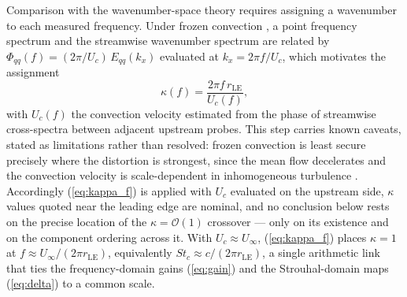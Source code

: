 \documentclass[lineno]{JFM-FLM_Au}
\begin{document}
Comparison with the wavenumber-space theory requires assigning a
wavenumber to each measured frequency. Under frozen convection
\citep{Taylor1938}, a point frequency spectrum and the streamwise
wavenumber spectrum are related by
$\Phi_{qq}(f) = (2\pi/U_c)\,E_{qq}(k_x)$ evaluated at
$k_x = 2\pi f/U_c$, which motivates the assignment
\begin{equation}
  \kappa(f) = \frac{2\pi f\,r_{\mathrm{LE}}}{U_c(f)},
  \label{eq:kappa_f}
\end{equation}
with $U_c(f)$ the convection velocity estimated from the phase of
streamwise cross-spectra between adjacent upstream probes. This step
carries known caveats, stated as limitations rather than resolved: frozen
convection is least secure precisely where the distortion is strongest,
since the mean flow decelerates and the convection velocity is
scale-dependent in inhomogeneous turbulence
\citep{WyngaardClifford1977,DelAlamoJimenez2009}. Accordingly
(\ref{eq:kappa_f}) is applied with $U_c$ evaluated on the upstream side,
$\kappa$ values quoted near the leading edge are nominal, and no
conclusion below rests on the precise location of the
$\kappa = \mathcal{O}(1)$ crossover --- only on its existence and on the
component ordering across it. With $U_c \approx U_\infty$,
(\ref{eq:kappa_f}) places $\kappa = 1$ at
$f \approx U_\infty/(2\pi r_{\mathrm{LE}})$, equivalently
$St_c \approx c/(2\pi r_{\mathrm{LE}})$, a single arithmetic link that
ties the frequency-domain gains (\ref{eq:gain}) and the Strouhal-domain
maps (\ref{eq:delta}) to a common scale.
\end{document}
